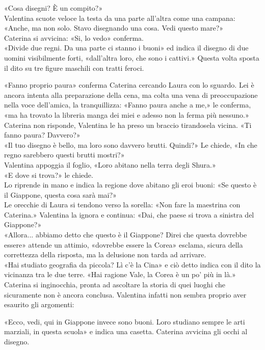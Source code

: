 \documentclass[10pt,oneside]{extbook}
\begin{document}
«Cosa disegni? \`E un compito?»\\
Valentina scuote veloce la testa da una parte all'altra come una campana: «Anche, ma non solo. Stavo disegnando una cosa. Vedi questo mare?»\\
Caterina si avvicina: «Si, lo vedo» conferma.\\
«Divide due regni. Da una parte ci stanno i buoni»  ed indica il disegno di due uomini visibilmente forti, «dall'altra loro, che sono i cattivi.» Questa volta sposta il dito su tre figure maschili con tratti feroci.


«Fanno proprio paura» conferma Caterina cercando Laura con lo sguardo. Lei \`e ancora intenta alla preparazione della cena, ma colta una vena di preoccupazione nella voce dell'amica, la tranquillizza: «Fanno paura anche a me,» le conferma, «ma ha trovato la libreria manga dei miei e adesso non la ferma pi\`u nessuno.» \\
Caterina non risponde, Valentina le ha preso un braccio tirandosela vicina. «Ti fanno paura? Davvero?»\\
«Il tuo disegno \`e bello, ma loro sono davvero brutti. Quindi?» Le chiede, «In che regno sarebbero questi brutti mostri?»\\
Valentina appoggia il foglio, «Loro abitano nella terra degli Shura.»\\
«E dove si trova?» le chiede.\\
Lo riprende in mano  e indica la regione dove abitano gli eroi buoni: «Se questo \`e il Giappone, questa cosa sarà mai?»\\
Le orecchie di Laura si tendono verso la sorella: «Non fare la maestrina con Caterina.» Valentina la ignora e continua: «Dai, che paese si trova a sinistra del Giappone?»\\
«Allora... abbiamo detto che questo \`e il Giappone? Direi che questa dovrebbe essere» attende un attimio, «dovrebbe essere la Corea» esclama, sicura della correttezza della risposta, ma la delusione non tarda ad arrivare.\\
«Hai studiato geografia da piccola? Lì c'\`e la Cina» e ciò detto indica con il dito la vicinanza tra le due terre.
«Hai ragione Vale, la Corea \`e un po' pi\`u in l\`a.»
Caterina si inginocchia, pronta ad ascoltare la storia di quei luoghi che sicuramente non \`e ancora conclusa. Valentina infatti non sembra proprio aver esaurito gli argomenti:

«Ecco, vedi, qui in Giappone invece sono buoni. Loro studiano sempre le arti marziali, in questa scuola» e indica una casetta.
Caterina  avvicina gli occhi al disegno.
\end{document}
